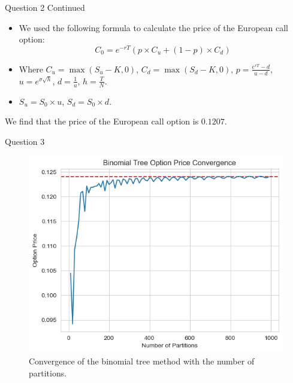 \documentclass[compress,12pt]{beamer}
\begin{document}
\begin{frame}{Question 2 Continued}

      \begin{itemize}
            \item We used the following formula to calculate the price of the European call option:
            \begin{equation*}
                  C_0 = e^{-rT} \left( p \times C_u + (1-p) \times C_d \right)
            \end{equation*}
            \item Where $C_u = \max(S_u - K, 0)$, $C_d = \max(S_d - K, 0)$, $p = \frac{e^{rT} - d}{u - d}$, $u = e^{\sigma \sqrt{h}}$, $d = \frac{1}{u}$, $h = \frac{T}{N}$.
            \item $S_u = S_0 \times u$, $S_d = S_0 \times d$.
      \end{itemize}

      \begin{tcolorbox}
            We find that the price of the European call option is $\boxed{0.1207}$.
      \end{tcolorbox}
\end{frame}

\begin{frame}{Question 3}
      \begin{figure}
            \centering
            \includegraphics[scale=0.6]{./imgs/binomialtreeconvergence.png}
            \caption{Convergence of the binomial tree method with the number of partitions.}
      \end{figure}
\end{frame}
 
\end{document}
